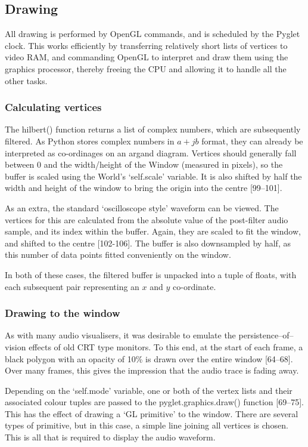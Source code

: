 \documentclass[11pt]{article}
\begin{document}
\subsection{Drawing}
All drawing is performed by OpenGL commands, and is scheduled by the Pyglet clock. This works efficiently by transferring relatively short lists of vertices to video RAM, and commanding OpenGL to interpret and draw them using the graphics processor, thereby freeing the CPU and allowing it to handle all the other tasks.

\subsubsection{Calculating vertices}
The hilbert() function returns a list of complex numbers, which are subsequently filtered. As Python stores complex numbers in $a+jb$ format, they can already be interpreted as co-ordinages on an argand diagram. Vertices should generally fall between 0 and the width/height of the Window (measured in pixels), so the buffer is scaled using the World's `self.scale' variable. It is also shifted by half the width and height of the window to bring the origin into the centre [99--101].

As an extra, the standard `oscilloscope style' waveform can be viewed. The vertices for this are calculated from the absolute value of the post-filter audio sample, and its index within the buffer. Again, they are scaled to fit the window, and shifted to the centre [102-106]. The buffer is also downsampled by half, as this number of data points fitted conveniently on the window.

In both of these cases, the filtered buffer is unpacked into a tuple of floats, with each subsequent pair representing an $x$ and $y$ co-ordinate.

\subsubsection{Drawing to the window}
As with many audio visualisers, it was desirable to emulate the persistence--of--vision effects of old CRT type monitors. To this end, at the start of each frame, a black polygon with an opacity of 10\% is drawn over the entire window [64--68]. Over many frames, this gives the impression that the audio trace is fading away.

Depending on the `self.mode' variable, one or both of the vertex lists and their associated colour tuples are passed to the pyglet.graphics.draw() function [69--75]. This has the effect of drawing a `GL primitive' to the window. There are several types of primitive, but in this case, a simple line joining all vertices is chosen. This is all that is required to display the audio waveform.
\end{document}
